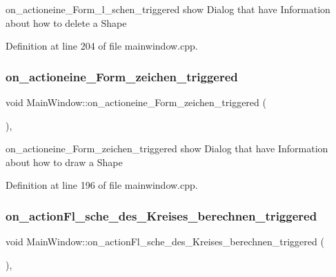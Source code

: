 on\+\_\+actioneine\+\_\+\+Form\+\_\+l\+\_\+schen\+\_\+triggered show Dialog that have Information about how to delete a Shape 



Definition at line 204 of file mainwindow.\+cpp.

\mbox{\label{class_main_window_a3576ee46f00f0be0850cdc6c7e495ea6}} 
\subsubsection{\texorpdfstring{on\+\_\+actioneine\+\_\+\+Form\+\_\+zeichen\+\_\+triggered}{on\_actioneine\_Form\_zeichen\_triggered}}
{\footnotesize\ttfamily void Main\+Window\+::on\+\_\+actioneine\+\_\+\+Form\+\_\+zeichen\+\_\+triggered (\begin{DoxyParamCaption}{ }\end{DoxyParamCaption})\hspace{0.3cm}{\ttfamily [private]}, {\ttfamily [slot]}}



on\+\_\+actioneine\+\_\+\+Form\+\_\+zeichen\+\_\+triggered show Dialog that have Information about how to draw a Shape 



Definition at line 196 of file mainwindow.\+cpp.

\mbox{\label{class_main_window_aa1da0f626fe8594775c5a43cd5271d53}} 
\subsubsection{\texorpdfstring{on\+\_\+action\+Fl\+\_\+sche\+\_\+des\+\_\+\+Kreises\+\_\+berechnen\+\_\+triggered}{on\_actionFl\_sche\_des\_Kreises\_berechnen\_triggered}}
{\footnotesize\ttfamily void Main\+Window\+::on\+\_\+action\+Fl\+\_\+sche\+\_\+des\+\_\+\+Kreises\+\_\+berechnen\+\_\+triggered (\begin{DoxyParamCaption}{ }\end{DoxyParamCaption})\hspace{0.3cm}{\ttfamily [private]}, {\ttfamily [slot]}}



